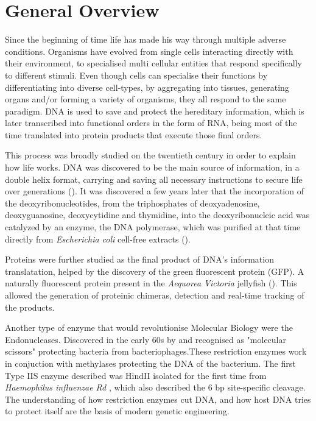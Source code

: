 \chapter{General Overview}

Since the beginning of time life has made his way through multiple adverse
conditions. Organisms have evolved from single cells interacting directly with
their environment, to specialised multi cellular entities that respond
specifically to different stimuli. Even though cells can specialise their
functions by differentiating into diverse cell-types, by aggregating into tissues,
generating organs and/or forming a variety of organisms, they all respond to the
same paradigm. DNA is used to save and protect the hereditary information, which
is later transcribed into functional orders in the form of RNA, being most of
the time translated into protein products that execute those final orders.

This process was broadly studied on the twentieth century in order to explain
how life works. DNA was discovered to be the main source of information, in a
double helix format, carrying and saving all necessary instructions to secure
life over generations (\cite{watson1953molecular}). It was discovered a few
years later that the incorporation of the deoxyribonucleotides, from the
triphosphates of deoxyadenosine, deoxyguanosine, deoxycytidine and thymidine,
into the deoxyribonucleic acid was catalyzed by an enzyme, the DNA polymerase,
which was purified at that time directly from \textit{Escherichia coli}
cell-free extracts (\cite{lehman1958enzymatic}). 

Proteins were further studied as the final product of DNA's information
translatation, helped by the discovery of the green fluorescent protein (GFP). A
naturally fluorescent protein present in the \textit{Aequorea Victoria}
jellyfish (\cite{shimomura1962extraction}). This allowed the generation of
proteinic chimeras, detection and real-time tracking of the products. 

Another type of enzyme that would revolutionise Molecular Biology were the
Endonucleases. Discovered in the early 60s by \cite{arber1962host} and
recognised as "molecular scissors" protecting bacteria from bacteriophages.These
restriction enzymes work in conjuction with methylases protecting the DNA of the
bacterium. The first Type IIS enzyme described was HindII isolated for the first
time from \textit{Haemophilus influenzae Rd} \cite{smith1973suggested}, which
also described the 6 bp site-specific cleavage. The understanding of how
restriction enzymes cut DNA, and how host DNA tries to protect itself are the
basis of modern genetic engineering.


